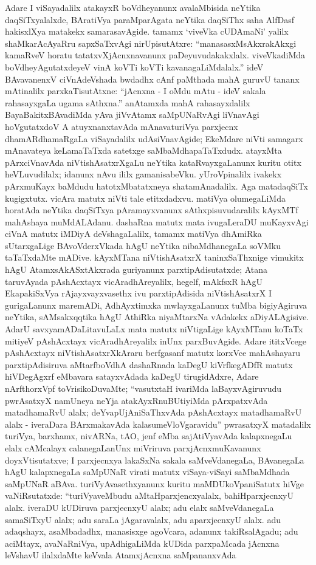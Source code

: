 Adare I viSayadalilx atakayxR boVdheyanunx avalaMbisida neYtika daqSiTxyalalxde, BAratiVya paraMparAgata neYtika daqSiThx saha AlfDasf hakisxlXya matakekx samarasavAgide. tamamx `viveVka cUDAmaNi' yalilx shaMkarAcAyaRru sapxSaTxvAgi nirUpisutAtxre: ``manasasxMsAkxrakAkxgi kamaRveV horatu tatatxvXjAcnxnavanunx paDeyuvudakakxlalx. viveVkadiMda boVdheyAgutatxdeyeV vinA koVTi koVTi kavanagaLiMdalalx.'' ideV BAvavanenxV ciVnAdeVshada bwdadhx cAnf paMthada mahA guruvU tananx mAtinalilx parxkaTisutAtxne: ``jAcnxna - I oMdu mAtu - ideV sakala rahasayxgaLa ugama sAthxna.'' anAtamxda mahA rahasayxdalilx BayaBakitxBAvadiMda yAva jiVvAtamx saMpUNaRvAgi liVnavAgi hoVgutatxdoV A atuyxnanxtavAda mAnavaturiVya parxjecnx dhamARdhamaRgaLa viSayadalilx udAsiVnavAgide; EkeMdare niVti samagarx mAnavateya keLamaTaTxda satetxge saMbaMdhapaTaTxdudx. atayxMta pArxciVnavAda niVtishAsatxrXgaLu neYtika kataRvayxgaLanunx kuritu otitx heVLuvudilalx; idanunx nAvu ililx gamanisabeVku. yUroVpinalilx ivakekx pArxmuKayx baMdudu hatotxMbatatxneya shatamAnadalilx. Aga matadaqSiTx kugigxtutx. vicAra matutx niVti tale etitxdadxvu. matiVya olumegaLiMda horatAda neYtika daqSiTxya pAramayxvanunx sAthxpisuvudaralilx kAyxMTf mahAshaya muMdALAdanu. dashaRna matutx mata ivugaLeraDU muKayxvAgi ciVnA matutx iMDiyA deVshagaLalilx, tamamx matiVya dhAmiRka sUtarxgaLige BAvoVderxVkada hAgU neYtika nibaMdhanegaLa soVMku taTaTxdaMte mADive. kAyxMTana niVtishAsatxrX taninxSaThxnige vimukitx hAgU AtamxsAkASxtAkxrada guriyanunx parxtipAdisutatxde; Atana taruvAyada pAshAcxtayx vicAradhAreyalilx, hegelf, mAkfsxR hAgU EkapakiSxVya rAjayxvayxvasethx ivu parxtipAdisida niVtishAsatxrX I gurigaLanunx maremADi, AdhAyxtimxka mwlayxgaLanunx tuMba bigiyAgiruva neYtika, sAMsakxqqtika hAgU AthiRka niyaMtarxNa vAdakekx aDiyALAgisive. AdarU savxyamADaLitavuLaLx mata matutx niVtigaLige kAyxMTanu koTaTx mitiyeV pAshAcxtayx vicAradhAreyalilx inUnx parxBuvAgide. Adare ititxVcege pAshAcxtayx niVtishAsatxrXkAraru berfgasanf matutx korxVce mahAshayaru parxtipAdisiruva aMtarfboVdhA dashaRnada kaDegU kiVrfkegADfR matutx hiVDegAgxrf eMbavara satayxvAdada kaDegU tirugidAdxre, Adare nArfthorxVpf toVrisikoDuvaMte; ``vasutxtaH ivariMda laBayxvAgiruvudu pwrAsatxyX namUneya neYja atakAyxRnuBUtiyiMda pArxpatxvAda matadhamaRvU alalx; deYvapUjAniSaThxvAda pAshAcxtayx matadhamaRvU alalx - iveraDara BArxmakavAda kalasumeVloVgaravidu'' pwrasatxyX matadalilx turiVya, barxhamx, nivARNa, tAO, jenf eMba sajAtiVyavAda kalapxnegaLu elalx cAMcalayx calanegaLanUnx miVriruva parxjAcnxmuKavanunx doyxVtisutatxve; I parxjecnxya lakaSxNa sakala saMveVdanegaLa, BAvanegaLa hAgU kalapxnegaLa saMpUNaR virati matutx viSaya-viSayi saMbaMdhada saMpUNaR aBAva. turiVyAvasethxyanunx kuritu maMDUkoVpaniSatutx hiVge vaNiRsutatxde: ``turiVyaveMbudu aMtaHparxjencxyalalx, bahiHparxjecnxyU alalx. iveraDU kUDiruva parxjecnxyU alalx; adu elalx saMveVdanegaLa samaSiTxyU alalx; adu saraLa jAgaravalalx, adu aparxjecnxyU alalx. adu adaqshayx, asaMbadadhx, manasisxge agoVcara, adanunx takiRsalAgadu; adu aciMtayx, avaNaRniVya, upAdhigaLiMda kUDida parxpaMcada jAcnxna leVshavU ilalxdaMte keVvala AtamxjAcnxna saMpananxvAda 